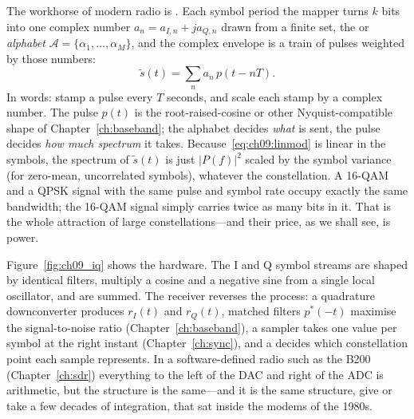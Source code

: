 The workhorse of modern radio is . Each symbol period the mapper turns
$k$ bits into one complex number $a_n=a_{I,n}+ja_{Q,n}$ drawn from a finite set, the
 or \emph{alphabet} $\mathcal A=\{\alpha_1,\dots,\alpha_M\}$, and the complex
envelope is a train of pulses weighted by those numbers:
\begin{equation}
\tilde s(t)=\sum_n a_n\,p(t-nT).
\label{eq:ch09:linmod}
\end{equation}
In words: stamp a pulse every $T$ seconds, and scale each stamp by a complex number. The pulse
$p(t)$ is the root-raised-cosine or other Nyquist-compatible shape of Chapter~\ref{ch:baseband};
the alphabet decides \emph{what} is sent, the pulse decides \emph{how much spectrum} it takes.
Because~\eqref{eq:ch09:linmod} is linear in the symbols, the spectrum of $\tilde s(t)$ is just
$|P(f)|^2$ scaled by the symbol variance (for zero-mean, uncorrelated symbols), whatever the
constellation. A 16-QAM and a QPSK signal with the same pulse and symbol rate occupy exactly the
same bandwidth; the 16-QAM signal simply carries twice as many bits in it. That is the whole
attraction of large constellations---and their price, as we shall see, is power.

Figure~\ref{fig:ch09_iq} shows the hardware. The I and Q symbol streams are shaped by identical
filters, multiply a cosine and a negative sine from a single local oscillator, and are summed.
The receiver reverses the process: a quadrature downconverter produces $r_I(t)$ and $r_Q(t)$,
matched filters $p^*(-t)$ maximise the signal-to-noise ratio (Chapter~\ref{ch:baseband}), a
sampler takes one value per symbol at the right instant (Chapter~\ref{ch:sync}), and a
 decides which constellation point each sample represents. In a software-defined
radio such as the B200 (Chapter~\ref{ch:sdr}) everything to the left of the DAC and right of the
ADC is arithmetic, but the structure is the same---and it is the same structure, give or take a
few decades of integration, that sat inside the modems of the 1980s.

